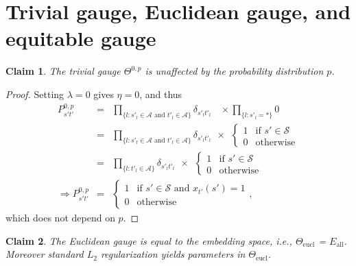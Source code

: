 \documentclass{article}
\numberwithin{myclaim}{section}
\newtheorem{claim}{Claim}
\begin{document}
\section{Trivial gauge, Euclidean gauge, and equitable gauge}

\begin{claim}
The trivial gauge $\Theta^{0,p}$ is unaffected by the probability distribution $p$.    
\end{claim}
\begin{proof}
Setting $\lambda = 0$ gives $\eta = 0$, and thus 
\begin{eqnarray}
    P^{0,p}_{s' t'} 
        &=&\!\!\!
            \prod_{\{l:s'_l \in \mathcal{A}  \textrm{ and } t'_l \in \mathcal{A}  \}}\!\!\! \delta_{s'_l t'_l}~~~~
            \times \!\!
            \prod_{\{l:s'_l = * \}} \!\! 0  \\
        &=& \prod_{\{l:s'_l \in \mathcal{A}  \textrm{ and } t'_l \in \mathcal{A}  \}}\!\!\! \delta_{s'_l t'_l}~~
            \times~~  \left\{
            \begin{array}{rl}
                1 & \textrm{if $s' \in \mathcal{S}$} \\
                0 & \textrm{otherwise} 
            \end{array} \right. \\
        &=& \prod_{\{l:t'_l \in \mathcal{A}  \}}\!\!\! \delta_{s'_l t'_l}~~
            \times~~  \left\{
            \begin{array}{rl}
                1 & \textrm{if $s' \in \mathcal{S}$} \\
                0 & \textrm{otherwise} 
            \end{array} \right. \\
      \Rightarrow P^{0,p}_{s' t'}  &=&  \left\{ 
            \begin{array}{rl}
                1 & \textrm{if $s' \in \mathcal{S}$ and $x_{t'}(s') = 1$} \\
                0 & \textrm{otherwise} 
            \end{array}
\right. ,
    \label{eq:projection_matrix}
\end{eqnarray}
which does not depend on $p$.
\end{proof}

\begin{claim}
The Euclidean gauge is equal to the embedding space, i.e., $\Theta_\mathrm{eucl}$ = $E_\mathrm{all}$. Moreover standard $L_2$ regularization yields parameters in $\Theta_\mathrm{eucl}$.
\end{claim}
\end{document}
